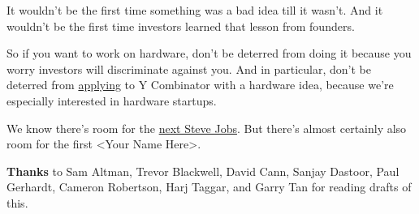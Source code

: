 It
                    wouldn't be the first time something was a bad idea till it
                    wasn't. And it wouldn't be the first time investors learned
                    that lesson from founders.

So if you want to work
                    on hardware, don't be deterred from doing it because you
                    worry investors will discriminate against you. And in
                    particular, don't be deterred from
                    \href{http://ycombinator.com/apply.html}{applying} to
                    Y Combinator with a hardware idea, because we're especially
                    interested in hardware startups.

We know there's
                    room for the \href{http://www.paulgraham.com/ambitious.html}{next Steve Jobs}.
                    But there's almost certainly also room for the first
                    <Your Name Here>.






                    \textbf{Thanks} to Sam Altman, Trevor Blackwell, David Cann,
                    Sanjay Dastoor, Paul Gerhardt, Cameron Robertson, Harj
                    Taggar, and Garry Tan for reading drafts of this.



              
            
          
